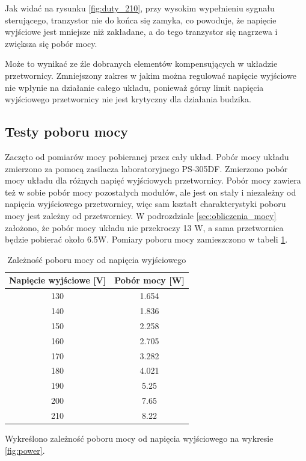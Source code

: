 \documentclass[../main.tex]{subfiles}
\begin{document}
Jak widać na rysunku \ref{fig:duty_210}, przy wysokim wypełnieniu sygnału sterującego,
tranzystor nie do końca się zamyka, co powoduje, że napięcie wyjściowe jest mniejsze niż zakładane, 
a do tego tranzystor się nagrzewa i zwiększa się pobór mocy.

Może to wynikać ze źle dobranych elementów kompensujących w układzie przetwornicy.
Zmniejszony zakres w jakim można regulować napięcie wyjściowe nie wpłynie na działanie całego układu,
ponieważ górny limit napięcia wyjściowego przetwornicy nie jest krytyczny dla działania budzika.

\subsection{Testy poboru mocy}
Zaczęto od pomiarów mocy pobieranej przez cały układ. Pobór mocy układu zmierzono za pomocą zasilacza laboratoryjnego PS-305DF.
Zmierzono pobór mocy układu dla różnych napięć wyjściowych przetwornicy. Pobór mocy zawiera też w sobie pobór mocy pozostałych modułów,
ale jest on stały i niezależny od napięcia wyjściowego przetwornicy, więc sam kształt charakterystyki poboru mocy jest zależny od przetwornicy.
W podrozdziale \ref{sec:obliczenia_mocy} założono, że pobór mocy układu nie przekroczy 13 W, a sama przetwornica będzie pobierać około 6.5W.
Pomiary poboru mocy zamieszczono w tabeli \ref{tab:power}.

\begin{table}[H]
    \centering
    \begin{tabular}{|c|c|}
        \hline
        Napięcie wyjściowe [V] & Pobór mocy [W] \\
        \hline
        130 & 1.654 \\
        140 & 1.836 \\
        150 & 2.258 \\
        160 & 2.705 \\
        170 & 3.282 \\
        180 & 4.021 \\
        190 & 5.25 \\
        200 & 7.65 \\
        210 & 8.22 \\
        \hline
    \end{tabular}
    \caption{Zależność poboru mocy od napięcia wyjściowego}
    \label{tab:power}
\end{table}

Wykreślono zależność poboru mocy od napięcia wyjściowego na wykresie \ref{fig:power}.
\end{document}
